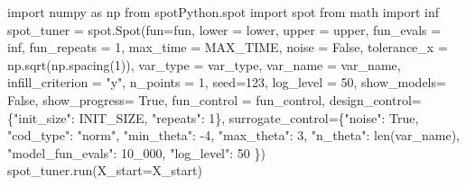 \documentclass[
  letterpaper,
  DIV=11,
  numbers=noendperiod]{scrreprt}
\newenvironment{Shaded}{\begin{snugshade}}{\end{snugshade}}
\newcommand{\BuiltInTok}[1]{\textcolor[rgb]{0.00,0.23,0.31}{#1}}
\newcommand{\DecValTok}[1]{\textcolor[rgb]{0.68,0.00,0.00}{#1}}
\newcommand{\ImportTok}[1]{\textcolor[rgb]{0.00,0.46,0.62}{#1}}
\newcommand{\NormalTok}[1]{\textcolor[rgb]{0.00,0.23,0.31}{#1}}
\newcommand{\OperatorTok}[1]{\textcolor[rgb]{0.37,0.37,0.37}{#1}}
\newcommand{\StringTok}[1]{\textcolor[rgb]{0.13,0.47,0.30}{#1}}
\newcommand{\VariableTok}[1]{\textcolor[rgb]{0.07,0.07,0.07}{#1}}
\begin{document}
\begin{Shaded}
\begin{Highlighting}[]
\ImportTok{import}\NormalTok{ numpy }\ImportTok{as}\NormalTok{ np}
\ImportTok{from}\NormalTok{ spotPython.spot }\ImportTok{import}\NormalTok{ spot}
\ImportTok{from}\NormalTok{ math }\ImportTok{import}\NormalTok{ inf}
\NormalTok{spot\_tuner }\OperatorTok{=}\NormalTok{ spot.Spot(fun}\OperatorTok{=}\NormalTok{fun,}
\NormalTok{                   lower }\OperatorTok{=}\NormalTok{ lower,}
\NormalTok{                   upper }\OperatorTok{=}\NormalTok{ upper,}
\NormalTok{                   fun\_evals }\OperatorTok{=}\NormalTok{ inf,}
\NormalTok{                   fun\_repeats }\OperatorTok{=} \DecValTok{1}\NormalTok{,}
\NormalTok{                   max\_time }\OperatorTok{=}\NormalTok{ MAX\_TIME,}
\NormalTok{                   noise }\OperatorTok{=} \VariableTok{False}\NormalTok{,}
\NormalTok{                   tolerance\_x }\OperatorTok{=}\NormalTok{ np.sqrt(np.spacing(}\DecValTok{1}\NormalTok{)),}
\NormalTok{                   var\_type }\OperatorTok{=}\NormalTok{ var\_type,}
\NormalTok{                   var\_name }\OperatorTok{=}\NormalTok{ var\_name,}
\NormalTok{                   infill\_criterion }\OperatorTok{=} \StringTok{"y"}\NormalTok{,}
\NormalTok{                   n\_points }\OperatorTok{=} \DecValTok{1}\NormalTok{,}
\NormalTok{                   seed}\OperatorTok{=}\DecValTok{123}\NormalTok{,}
\NormalTok{                   log\_level }\OperatorTok{=} \DecValTok{50}\NormalTok{,}
\NormalTok{                   show\_models}\OperatorTok{=} \VariableTok{False}\NormalTok{,}
\NormalTok{                   show\_progress}\OperatorTok{=} \VariableTok{True}\NormalTok{,}
\NormalTok{                   fun\_control }\OperatorTok{=}\NormalTok{ fun\_control,}
\NormalTok{                   design\_control}\OperatorTok{=}\NormalTok{\{}\StringTok{"init\_size"}\NormalTok{: INIT\_SIZE,}
                                   \StringTok{"repeats"}\NormalTok{: }\DecValTok{1}\NormalTok{\},}
\NormalTok{                   surrogate\_control}\OperatorTok{=}\NormalTok{\{}\StringTok{"noise"}\NormalTok{: }\VariableTok{True}\NormalTok{,}
                                      \StringTok{"cod\_type"}\NormalTok{: }\StringTok{"norm"}\NormalTok{,}
                                      \StringTok{"min\_theta"}\NormalTok{: }\OperatorTok{{-}}\DecValTok{4}\NormalTok{,}
                                      \StringTok{"max\_theta"}\NormalTok{: }\DecValTok{3}\NormalTok{,}
                                      \StringTok{"n\_theta"}\NormalTok{: }\BuiltInTok{len}\NormalTok{(var\_name),}
                                      \StringTok{"model\_fun\_evals"}\NormalTok{: }\DecValTok{10\_000}\NormalTok{,}
                                      \StringTok{"log\_level"}\NormalTok{: }\DecValTok{50}
\NormalTok{                                      \})}
\NormalTok{spot\_tuner.run(X\_start}\OperatorTok{=}\NormalTok{X\_start)}
\end{Highlighting}
\end{Shaded}
\end{document}

